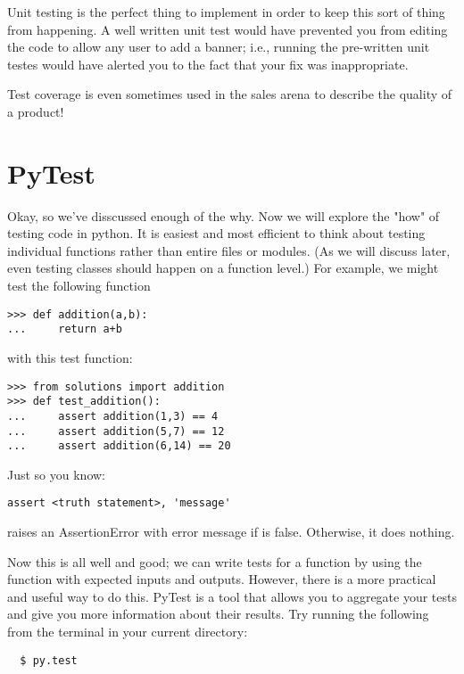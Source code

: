 Unit testing is the perfect thing to implement in order to keep this sort of thing from happening.
A well written unit test would have prevented you from editing the code to allow any user to add a banner; i.e., running the pre-written unit testes would have alerted you to the fact that your fix was inappropriate.

Test coverage is even sometimes used in the sales arena to describe the quality of a product!

\section*{PyTest}

Okay, so we've disscussed enough of the why. Now we will explore the "how" of testing code in python.
It is easiest and most efficient to think about testing individual functions rather than entire files or modules.
(As we will discuss later, even testing classes should happen on a function level.)
For example, we might test the following function

\begin{lstlisting}
>>> def addition(a,b):
...     return a+b
\end{lstlisting}
with this test function:
\begin{lstlisting}
>>> from solutions import addition
>>> def test_addition():
...     assert addition(1,3) == 4
...     assert addition(5,7) == 12
...     assert addition(6,14) == 20
\end{lstlisting}

\begin{info}
Just so you know:
\begin{lstlisting}
assert <truth statement>, 'message'
\end{lstlisting}
raises an AssertionError with error message  if  is false.  Otherwise, it does nothing.
\end{info}


Now this is all well and good; we can write tests for a function by using the  function with expected inputs and outputs.
However, there is a more practical and useful way to do this.  PyTest is a tool that allows you to aggregate your tests and give you more information about their results.
Try running the following from the terminal in your current directory:

\begin{lstlisting}
  $ py.test
\end{lstlisting}

